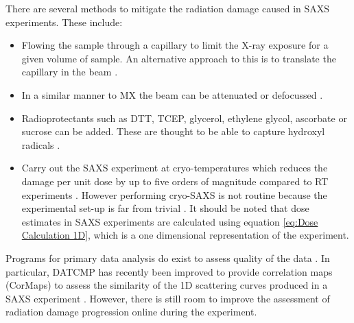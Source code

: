     There are several methods to mitigate the radiation damage caused in SAXS experiments. These include:
    \begin{itemize}
        \item Flowing the sample through a capillary to limit the X-ray exposure for a given volume of sample. An alternative approach to this is to translate the capillary in the beam \cite{jeffries2015limiting}.
        \item In a similar manner to MX the beam can be attenuated or defocussed \cite{jeffries2015limiting}.
        \item Radioprotectants such as DTT, TCEP, glycerol, ethylene glycol, ascorbate or sucrose can be added. These are thought to be able to capture hydroxyl radicals \cite{grishaev2012sample}.
        \item Carry out the SAXS experiment at cryo-temperatures which reduces the damage per unit dose by up to five orders of magnitude compared to RT experiments \cite{meisburger2013breaking}. However performing cryo-SAXS is not routine because the experimental set-up is far from trivial \cite{jeffries2015limiting}. It should be noted that dose estimates in SAXS experiments are calculated using equation \ref{eq:Dose Calculation 1D}, which is a one dimensional representation of the experiment.
    \end{itemize}

    Programs for primary data analysis do exist to assess quality of the data \cite{petoukhov2012new}. In particular, DATCMP has recently been improved to provide correlation maps (CorMaps) to assess the similarity of the 1D scattering curves produced in a SAXS experiment \cite{franke2015correlation}. However, there is still room to improve the assessment of radiation damage progression online during the experiment.


